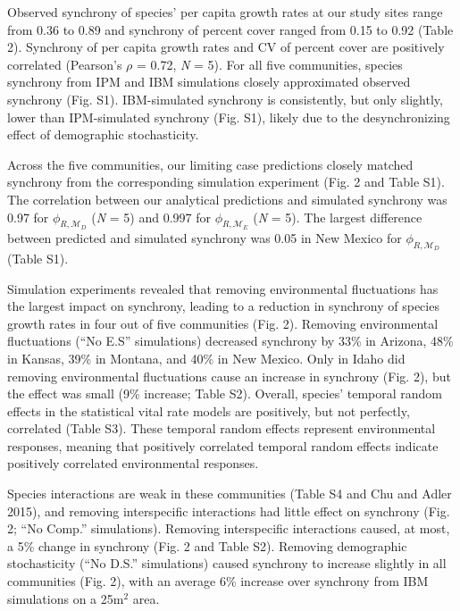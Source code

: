 \documentclass[12pt,]{article}
\begin{document}
Observed synchrony of species' per capita growth rates
at our study sites range from 0.36 to 0.89 and synchrony of percent
cover ranged from 0.15 to 0.92 (Table 2). Synchrony of per capita growth
rates and CV of percent cover are positively correlated (Pearson's
\(\rho\) = 0.72, \emph{N} = 5). For all five communities, species
synchrony from IPM and IBM simulations closely approximated observed
synchrony (Fig. S1). IBM-simulated synchrony is consistently, but only
slightly, lower than IPM-simulated synchrony (Fig. S1), likely due to
the desynchronizing effect of demographic stochasticity.

Across the five communities, our limiting case predictions closely
matched synchrony from the corresponding simulation experiment (Fig. 2
and Table S1). The correlation between our analytical predictions and
simulated synchrony was 0.97 for \(\phi_{R,\mathcal{M}_D}\) (\emph{N} =
5) and 0.997 for \(\phi_{R,\mathcal{M}_E}\) (\emph{N} = 5). The largest
difference between predicted and simulated synchrony was 0.05 in New
Mexico for \(\phi_{R,\mathcal{M}_D}\) (Table S1).

Simulation experiments revealed that removing environmental fluctuations
has the largest impact on synchrony, leading to a reduction in synchrony
of species growth rates in four out of five communities (Fig. 2).
Removing environmental fluctuations (``No E.S'' simulations) decreased
synchrony by 33\% in Arizona, 48\% in Kansas, 39\% in Montana, and 40\%
in New Mexico. Only in Idaho did removing environmental fluctuations
cause an increase in synchrony (Fig. 2), but the effect was small (9\%
increase; Table S2). Overall, species' temporal random effects in the
statistical vital rate models are positively, but not perfectly,
correlated (Table S3).
These temporal random effects represent environmental responses, meaning that positively correlated temporal random effects indicate positively correlated environmental responses.

Species interactions are weak in these communities (Table S4 and Chu and
Adler 2015), and removing interspecific interactions had little effect
on synchrony (Fig. 2; ``No Comp.'' simulations). Removing interspecific
interactions caused, at most, a 5\% change in synchrony (Fig. 2 and
Table S2). Removing demographic stochasticity (``No D.S.'' simulations)
caused synchrony to increase slightly in all communities (Fig. 2), with
an average 6\% increase over synchrony from IBM simulations on a
25\(\text{m}^2\) area.
\end{document}
